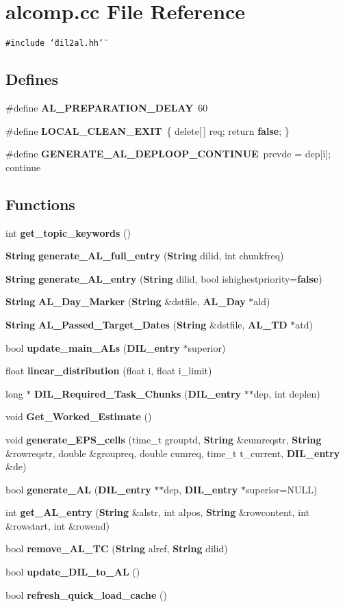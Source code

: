 \section{alcomp.cc File Reference}
\label{alcomp_8cc}
{\tt \#include \char`\"{}dil2al.hh\char`\"{}}\par
\subsection*{Defines}
\begin{CompactItemize}
\item 
\#define {\bf AL\_\-PREPARATION\_\-DELAY}\ 60
\item 
\#define {\bf LOCAL\_\-CLEAN\_\-EXIT}\ \{ delete[$\,$] req; return {\bf false}; \}
\item 
\#define {\bf GENERATE\_\-AL\_\-DEPLOOP\_\-CONTINUE}\ prevde = dep[i]; continue
\end{CompactItemize}
\subsection*{Functions}
\begin{CompactItemize}
\item 
int {\bf get\_\-topic\_\-keywords} ()
\item 
{\bf String} {\bf generate\_\-AL\_\-full\_\-entry} ({\bf String} dilid, int chunkfreq)
\item 
{\bf String} {\bf generate\_\-AL\_\-entry} ({\bf String} dilid, bool ishighestpriority={\bf false})
\item 
{\bf String} {\bf AL\_\-Day\_\-Marker} ({\bf String} \&dstfile, {\bf AL\_\-Day} $\ast$ald)
\item 
{\bf String} {\bf AL\_\-Passed\_\-Target\_\-Dates} ({\bf String} \&dstfile, {\bf AL\_\-TD} $\ast$atd)
\item 
bool {\bf update\_\-main\_\-ALs} ({\bf DIL\_\-entry} $\ast$superior)
\item 
float {\bf linear\_\-distribution} (float i, float i\_\-limit)
\item 
long $\ast$ {\bf DIL\_\-Required\_\-Task\_\-Chunks} ({\bf DIL\_\-entry} $\ast$$\ast$dep, int deplen)
\item 
void {\bf Get\_\-Worked\_\-Estimate} ()
\item 
void {\bf generate\_\-EPS\_\-cells} (time\_\-t grouptd, {\bf String} \&cumreqstr, {\bf String} \&rowreqstr, double \&groupreq, double cumreq, time\_\-t t\_\-current, {\bf DIL\_\-entry} \&de)
\item 
bool {\bf generate\_\-AL} ({\bf DIL\_\-entry} $\ast$$\ast$dep, {\bf DIL\_\-entry} $\ast$superior=NULL)
\item 
int {\bf get\_\-AL\_\-entry} ({\bf String} \&alstr, int alpos, {\bf String} \&rowcontent, int \&rowstart, int \&rowend)
\item 
bool {\bf remove\_\-AL\_\-TC} ({\bf String} alref, {\bf String} dilid)
\item 
bool {\bf update\_\-DIL\_\-to\_\-AL} ()
\item 
bool {\bf refresh\_\-quick\_\-load\_\-cache} ()
\end{CompactItemize}


